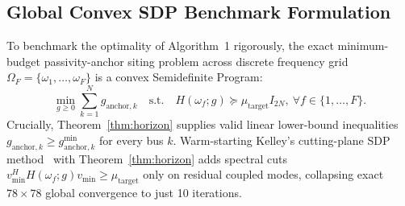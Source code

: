 \documentclass[10pt,twocolumn]{article}
\begin{document}
\subsection{Global Convex SDP Benchmark Formulation}
To benchmark the optimality of Algorithm~1 rigorously, the exact minimum-budget passivity-anchor siting problem across discrete frequency grid $\Omega_F=\{\omega_1,\dots,\omega_F\}$ is a convex Semidefinite Program:
\begin{equation}
\min_{g\ge 0} \sum_{k=1}^{N} g_{\text{anchor},k} \quad \text{s.t.} \quad H(\omega_f; g) \succeq \mu_{\text{target}} I_{2N},\ \forall f\in\{1,\dots,F\}.
\label{eq:sdp}
\end{equation}
Crucially, Theorem~\ref{thm:horizon} supplies valid linear lower-bound inequalities $g_{\text{anchor},k}\ge g_{\text{anchor},k}^{\min}$ for every bus $k$. Warm-starting Kelley's cutting-plane SDP method~\cite{kelley1960cutting} with Theorem~\ref{thm:horizon} adds spectral cuts $v_{\min}^H H(\omega_f; g) v_{\min}\ge\mu_{\text{target}}$ only on residual coupled modes, collapsing exact $78\times 78$ global convergence to just 10 iterations.
\end{document}
